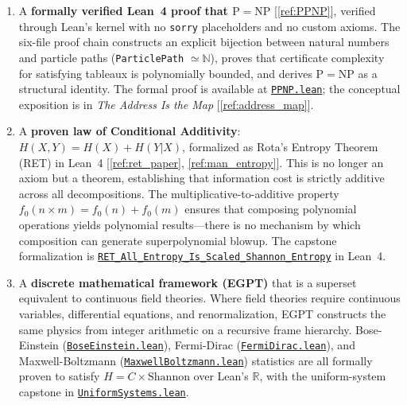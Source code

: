 \documentclass[11pt,a4paper]{article}
\begin{document}
\begin{enumerate}[label=(\roman*)]
    \item A \textbf{formally verified Lean~4 proof that $\mathrm{P} = \mathrm{NP}$} [\ref{ref:PPNP}], verified through Lean's kernel with no \texttt{sorry} placeholders and no custom axioms. The six-file proof chain constructs an explicit bijection between natural numbers and particle paths (\texttt{ParticlePath} $\simeq \mathbb{N}$), proves that certificate complexity for satisfying tableaux is polynomially bounded, and derives $\mathrm{P} = \mathrm{NP}$ as a structural identity. The formal proof is available at \href{https://eabadir.github.io/EGPT/Lean/EGPT/Complexity/PPNP.lean}{\texttt{PPNP.lean}}; the conceptual exposition is in \emph{The Address Is the Map} [\ref{ref:address_map}].

    \item A \textbf{proven law of Conditional Additivity}: $H(X,Y) = H(X) + H(Y|X)$, formalized as Rota's Entropy Theorem (RET) in Lean~4 [\ref{ref:ret_paper}, \ref{ref:man_entropy}]. This is no longer an axiom but a theorem, establishing that information cost is strictly additive across all decompositions. The multiplicative-to-additive property $f_0(n \times m) = f_0(n) + f_0(m)$ ensures that composing polynomial operations yields polynomial results---there is no mechanism by which composition can generate superpolynomial blowup. The capstone formalization is \href{https://eabadir.github.io/EGPT/Lean/EGPT/NumberTheory/Analysis.lean}{\texttt{RET\_All\_Entropy\_Is\_Scaled\_Shannon\_Entropy}} in Lean~4.

    \item A \textbf{discrete mathematical framework (EGPT)} that is a superset equivalent to continuous field theories. Where field theories require continuous variables, differential equations, and renormalization, EGPT constructs the same physics from integer arithmetic on a recursive frame hierarchy. Bose-Einstein (\href{https://eabadir.github.io/EGPT/Lean/EGPT/Physics/BoseEinstein.lean}{\texttt{BoseEinstein.lean}}), Fermi-Dirac (\href{https://eabadir.github.io/EGPT/Lean/EGPT/Physics/FermiDirac.lean}{\texttt{FermiDirac.lean}}), and Maxwell-Boltzmann (\href{https://eabadir.github.io/EGPT/Lean/EGPT/Physics/MaxwellBoltzmann.lean}{\texttt{MaxwellBoltzmann.lean}}) statistics are all formally proven to satisfy $H = C \times \text{Shannon}$ over Lean's $\mathbb{R}$, with the uniform-system capstone in \href{https://eabadir.github.io/EGPT/Lean/EGPT/Physics/UniformSystems.lean}{\texttt{UniformSystems.lean}}.


\end{enumerate}
\end{document}
